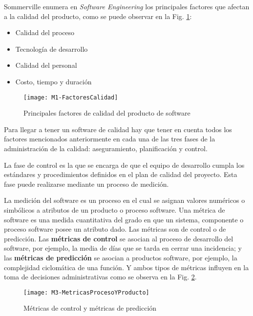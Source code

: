 Sommerville enumera en \textit{Software Engineering} \cite{sommerville_ingenierisoftware_2002} los principales factores que afectan a la calidad del producto, como se puede observar en la Fig. \ref{fig:M3-FactoresCalidad}:
\begin{itemize}
	\tightlist
	\item Calidad del proceso
	\item Tecnología de desarrollo
	\item Calidad del personal
	\item Costo, tiempo y duración
\end{itemize}
\begin{figure}[!h]
	\centering
	\texttt{[image: M1-FactoresCalidad]}
	\caption{Principales factores de calidad del producto de software\cite{sommerville_ingenierisoftware_2002}}\label{fig:M3-FactoresCalidad}
\end{figure}
\FloatBarrier


Para llegar a tener un software de calidad hay que tener en cuenta todos los factores mencionados anteriormente en cada una de las tres fases de la administración de la calidad: aseguramiento, planificación y control.

La fase de control es la que se encarga de que el equipo de desarrollo cumpla los estándares y procedimientos definidos en el plan de calidad del proyecto. Esta fase puede realizarse mediante un proceso de medición.

La medición del software es un proceso en el cual se asignan valores numéricos o simbólicos a atributos de un producto o proceso software. Una métrica de software es una medida cuantitativa del grado en que un sistema, componente o proceso software posee un atributo dado. Las métricas son de control o de predicción. Las \textbf{métricas de control} se asocian al proceso de desarrollo del software, por ejemplo, la media de días que se tarda en cerrar una incidencia; y las \textbf{métricas de predicción} se asocian a productos software, por ejemplo, la complejidad ciclomática de una función. Y ambos tipos de métricas influyen en la toma de decisiones administrativas como se observa en la Fig. \ref{fig:M3-MetricasProcesoYProducto}.
\begin{figure}[!h]
	\centering
	\texttt{[image: M3-MetricasProcesoYProducto]}
	\caption{Métricas de control y métricas de predicción\cite{sommerville_ingenierisoftware_2002}}\label{fig:M3-MetricasProcesoYProducto}
\end{figure}
